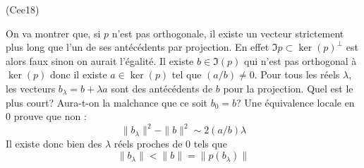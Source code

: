 \begin{tiny}(Cee18)\end{tiny} On va montrer que, si $p$ n'est pas orthogonale, il existe un vecteur strictement plus long que l'un de ses antécédents par projection. \newline
En effet $\Im p \subset \ker(p)^{\perp}$ est alors faux sinon on aurait l'égalité. Il existe $b \in \Im(p)$ qui n'est pas orthogonal à $\ker(p)$ donc il existe $a\in \ker(p)$ tel que $(a/b)\neq 0$. Pour tous les réels $\lambda$, les vecteurs $b_{\lambda} = b+\lambda a$ sont des antécédents de $b$ pour la projection. Quel est le plus court? Aura-t-on la malchance que ce soit $b_0 = b$?\newline
Une équivalence locale en $0$ prouve que non :
\begin{displaymath}
  \|b_\lambda \|^2 - \|b \|^2 \sim 2(a/b)\lambda
\end{displaymath}
Il existe donc bien des $\lambda$ réels proches de 0 tels que 
\begin{displaymath}
  \|b_\lambda \| < \|b \| = \|p(b_\lambda) \|
\end{displaymath}
